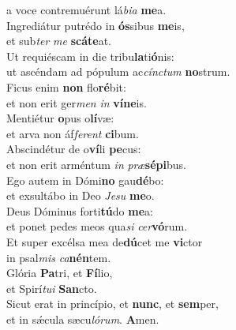 \evenverse a voce contremuérunt lá\textit{bi}\textit{a} \textbf{me}a.\\
\oddverse Ingrediátur putrédo in \textbf{ós}sibus \textbf{me}is,~\*\\
\oddverse et sub\textit{ter} \textit{me} \textbf{scá}\textbf{te}at.\\
\evenverse Ut requiéscam in die tribu\textbf{la}ti\textbf{ó}nis:~\*\\
\evenverse ut ascéndam ad pópulum ac\textit{cín}\textit{ctum} \textbf{no}strum.\\
\oddverse Ficus enim \textbf{non} flo\textbf{ré}bit:~\*\\
\oddverse et non erit ger\textit{men} \textit{in} \textbf{ví}\textbf{ne}is.\\
\evenverse Mentiétur \textbf{o}pus o\textbf{lí}væ:~\*\\
\evenverse et arva non áf\textit{fe}\textit{rent} \textbf{ci}bum.\\
\oddverse Abscindétur de o\textbf{ví}li \textbf{pe}cus:~\*\\
\oddverse et non erit arméntum \textit{in} \textit{præ}\textbf{sé}\textbf{pi}bus.\\
\evenverse Ego autem in Dómi\textbf{no} gau\textbf{dé}bo:~\*\\
\evenverse et exsultábo in Deo \textit{Je}\textit{su} \textbf{me}o.\\
\oddverse Deus Dóminus forti\textbf{tú}do \textbf{me}a:~\*\\
\oddverse et ponet pedes meos qua\textit{si} \textit{cer}\textbf{vó}rum.\\
\evenverse Et super excélsa mea de\textbf{dú}cet me \textbf{vi}ctor~\*\\
\evenverse in psal\textit{mis} \textit{ca}\textbf{nén}tem.\\
\oddverse Glória \textbf{Pa}tri, et \textbf{Fí}lio,~\*\\
\oddverse et Spirí\textit{tu}\textit{i} \textbf{San}cto.\\
\evenverse Sicut erat in princípio, et \textbf{nunc}, et \textbf{sem}per,~\*\\
\evenverse et in sǽcula sæcu\textit{ló}\textit{rum}. \textbf{A}men.\\
